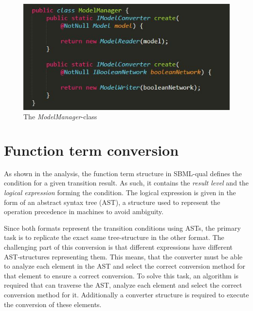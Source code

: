 \begin{figure}[H]
    \centering
    \includegraphics{Sections/Images/ModelManager.JPG}
    \caption{The \emph{ModelManager}-class}
    \label{fig:modelManager}
\end{figure}

\section{Function term conversion}
As shown in the analysis, the function term structure in SBML-qual defines the condition for a given transition result.
As such, it contains the \emph{result level} and the \emph{logical expression} forming the condition.
The logical expression is given in the form of an abstract syntax tree (AST), a structure used to represent the operation precedence in machines to avoid ambiguity.

Since both formats represent the transition conditions using ASTs, the primary task is to replicate the exact same tree-structure in the other format. The challenging part of this conversion is that different expressions have different AST-structures representing them. This means, that the converter must be able to analyze each element in the AST and select the correct conversion method for that element to ensure a correct conversion.
To solve this task, an algorithm is required that can traverse the AST, analyze each element and select the correct conversion method for it. Additionally a converter structure is required to execute the conversion of these elements.

